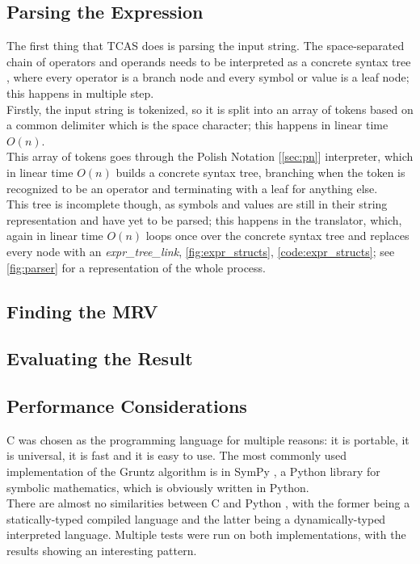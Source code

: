 \documentclass{article}
\theoremstyle{plain}
\theoremstyle{definition}
\begin{document}
	\subsection{Parsing the Expression}
	
	The first thing that TCAS does is parsing the input string. The space-separated chain of operators and operands needs to be interpreted as a concrete syntax tree \cite{wiki:parsetree}\cite{wiki:abtree}, where every operator is a branch node and every symbol or value is a leaf node; this happens in multiple step.\\
	Firstly, the input string is tokenized, so it is split into an array of tokens based on a common delimiter which is the space character; this happens in linear time \(O(n)\). \\
	This array of tokens goes through the Polish Notation [\ref{sec:pn}] interpreter, which in linear time \(O(n)\) builds a concrete syntax tree, branching when the token is recognized to be an operator and terminating with a leaf for anything else. \\
	This tree is incomplete though, as symbols and values are still in their string representation and have yet to be parsed; this happens in the translator, which, again in linear time \(O(n)\) loops once over the concrete syntax tree and replaces every node with an \textit{expr\_tree\_link}, \cref{fig:expr_structs}, \cref{code:expr_structs}; see \cref{fig:parser} for a representation of the whole process.
	
	\subsection{Finding the MRV}
	
	
	
	\subsection{Evaluating the Result}
	
	\subsection{Performance Considerations}
	
	C was chosen as the programming language for multiple reasons: it is portable, it is universal, it is fast and it is easy to use.
	The most commonly used implementation of the Gruntz algorithm is in SymPy \cite{10.7717/peerj-cs.103}, a Python library for symbolic mathematics, which is obviously written in Python. \\
	There are almost no similarities between C and Python \cite{book:python}, with the former being a statically-typed \cite{wiki:typesystem} compiled language and the latter being a dynamically-typed \cite{wiki:typesystem} interpreted language. 
	Multiple tests were run on both implementations, with the results showing an interesting pattern.
	
\end{document}
